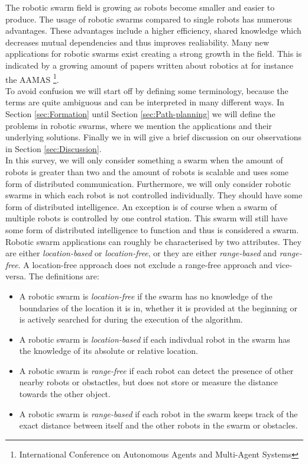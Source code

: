 The robotic swarm field is growing as robots become smaller and easier to produce.
The usage of robotic swarms compared to single robots has numerous advantages. 
These advantages include a higher efficiency, shared knowledge which decreases mutual dependencies and thus improves realiability.
Many new applications for robotic swarms exist creating a strong growth in the field.
This is indicated by a growing amount of papers written about robotics at for instance the AAMAS \footnote{International Conference on Autonomous Agents and Multi-Agent Systems}.\cite{Amigoni2014}\\

To avoid confusion we will start off by defining some terminology, because the terms are quite ambiguous and can be interpreted in many different ways.
In Section \ref{sec:Formation} until Section \ref{sec:Path-planning} we will define the problems in robotic swarms, where we mention the applications and their underlying solutions.
Finally we in will give a brief discussion on our observations in Section \ref{sec:Discussion}.\\

In this survey, we will only consider something a swarm when the amount of robots is greater than two and the amount of robots is scalable and uses some form of distributed communication.
Furthermore, we will only consider robotic swarms in which each robot is not controlled individually.
They should have some form of distributed intelligence.
An exception is of course when a swarm of multiple robots is controlled by one control station.
This swarm will still have some form of distributed intelligence to function and thus is considered a swarm.  \\

Robotic swarm applications can roughly be characterised by two attributes. They are either \emph{location-based} or \emph{location-free}, or they are either \emph{range-based} and  \emph{range-free}.
A location-free approach does not exclude a range-free approach and vice-versa. 
The definitions are:

  \begin{itemize}
    \item A robotic swarm is \emph{location-free} if the swarm has no knowledge of the boundaries of the location it is in, whether it is provided at the beginning or is actively searched for during the execution of the algorithm. 
    \item A robotic swarm is \emph{location-based} if each indivdual robot in the swarm has the knowledge of its absolute or relative location.
    \item A robotic swarm is \emph{range-free} if each robot can detect the presence of other nearby robots or obstactles, but does not store or measure the distance towards the other object.
    \item A robotic swarm is \emph{range-based} if each robot in the swarm keeps track of the exact distance between itself and the other robots in the swarm or obstacles. 
  \end{itemize}

  

